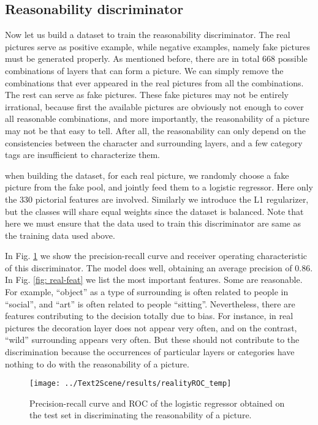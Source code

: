 \documentclass{article} %
\begin{document}
\subsection{Reasonability discriminator}
Now let us build a dataset to train the reasonability discriminator. The real pictures serve as positive example, while negative examples, namely fake pictures must be generated properly. As mentioned before, there are in total 668 possible combinations of layers that can form a picture. We can simply remove the combinations that ever appeared in the real pictures from all the combinations. The rest can serve as fake pictures. These fake pictures may not be entirely irrational, because first the available pictures are obviously not enough to cover all reasonable combinations, and more importantly, the reasonability of a picture may not be that easy to tell. After all, the reasonability can only depend on the consistencies between the character and surrounding layers, and a few category tags are insufficient to characterize them.

when building the dataset, for each real picture, we randomly choose a fake picture from the fake pool, and jointly feed them to a logistic regressor. Here only the 330 pictorial features are involved.  Similarly we introduce the L1 regularizer, but the classes will share equal weights since the dataset is balanced. Note that here we must ensure that the data used to train this discriminator are same as the training data used above.

In Fig. \ref{fig: real-metric} we show the precision-recall curve and receiver operating characteristic of this discriminator. The model does well, obtaining an average precision of 0.86. In Fig. \ref{fig: real-feat} we list the most important features. Some are reasonable. For example, ``object'' as a type of surrounding is often related to people in ``social'', and ``art'' is often related to people ``sitting''. Nevertheless, there are features contributing to the decision totally due to bias. For instance, in real pictures the decoration layer does not appear very often, and on the contrast, ``wild'' surrounding appears very often. But these should not contribute to the discrimination because the occurrences of particular layers or categories have nothing to do with the reasonability of a picture.

\begin{figure}
	\centering
	\texttt{[image: ../Text2Scene/results/realityROC\_temp]}
	\caption{Precision-recall curve and ROC of the logistic regressor obtained on the test set in discriminating the reasonability of a picture.}
	\label{fig: real-metric}
\end{figure}
\end{document}
